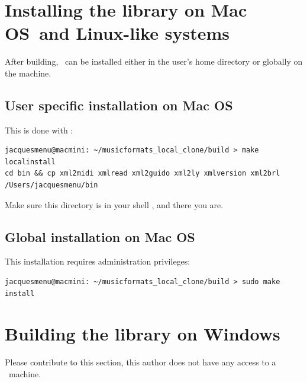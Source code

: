 \section{Installing the library on Mac OS\texttrademark\ and Linux-like systems}

After building, \mf\ can be installed either in the user's home directory or globally on the machine.


\subsection{User specific installation on Mac OS\texttrademark}

This is done with :
\begin{lstlisting}[language=Terminal]
jacquesmenu@macmini: ~/musicformats_local_clone/build > make localinstall
cd bin && cp xml2midi xmlread xml2guido xml2ly xmlversion xml2brl /Users/jacquesmenu/bin
\end{lstlisting}

Make sure this  directory is in your shell , and there you are.


\subsection{Global installation on Mac OS\texttrademark}

This installation requires administration privileges:
\begin{lstlisting}[language=Terminal]
jacquesmenu@macmini: ~/musicformats_local_clone/build > sudo make install
\end{lstlisting}


\section{Building the library on Windows\texttrademark}

Please contribute to this section, this author does not have any access to a \Windows\ machine.


